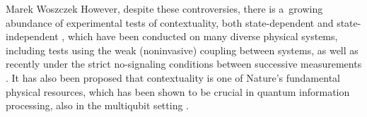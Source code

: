 \begin{artengenv}{Marek Woszczek}
However, despite these controversies, there is a~growing abundance of experimental tests of contextuality, both state-dependent
\parencites[e.g.][]{liu_experimental_2009}[][]{liu_experimental_2009}[][]{liu_experimental_2009}[][]{liu_experimental_2009}[][]{liu_experimental_2009}[][]{liu_experimental_2009}[][]{liu_experimental_2009} %
 and state-independent 
\parencites[e.g.][]{amselem_state-independent_2009}[][]{amselem_state-independent_2009}[][]{amselem_state-independent_2009}[][]{amselem_state-independent_2009}[][]{amselem_state-independent_2009}[][]{amselem_state-independent_2009}[][]{amselem_state-independent_2009}[][]{amselem_state-independent_2009}[][]{amselem_state-independent_2009}[][]{amselem_state-independent_2009}, %
 which have been conducted on many diverse physical systems, including tests using the weak (noninvasive) coupling between systems, as well as recently under the strict no-signaling conditions between successive measurements 
\parencite[][]{xiao_experimental_2018}. %
 It has also been proposed that contextuality is one of Nature's fundamental physical resources, which has been shown to be crucial in quantum information processing, also in the multiqubit setting 
\parencites[][]{raussendorf_contextuality_2013}[][]{raussendorf_contextuality_2013}[][]{raussendorf_contextuality_2013}.%



\end{artengenv}
